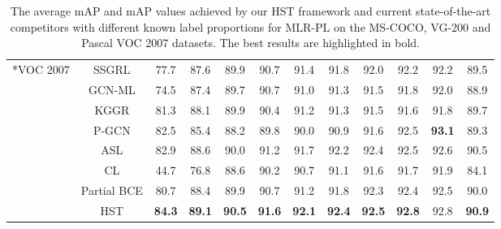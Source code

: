 \begin{table*}
\begin{tabular}{c|c|ccccccccc|c}
  \hline
  \centering \multirow{8}*{VOC 2007} & SSGRL & 77.7 & 87.6 & 89.9 & 90.7 & 91.4 & 91.8 & 92.0 & 92.2 & 92.2 & 89.5 \\
\centering ~ & GCN-ML & 74.5 & 87.4 & 89.7 & 90.7 & 91.0 & 91.3 & 91.5 & 91.8 & 92.0 & 88.9 \\
  \centering ~ & KGGR & 81.3 & 88.1 & 89.9 & 90.4 & 91.2 & 91.3 & 91.5 & 91.6 & 91.8 & 89.7 \\
  \centering ~ & P-GCN & 82.5 & 85.4 & 88.2 & 89.8 & 90.0 & 90.9 & 91.6 & 92.5 & \textbf{93.1} & 89.3 \\
  \centering ~ & ASL & 82.9 & 88.6 & 90.0 & 91.2 & 91.7 & 92.2 & 92.4 & 92.5 & 92.6 & 90.5 \\
  \centering ~ & CL & 44.7 & 76.8 & 88.6 & 90.2 & 90.7 & 91.1 & 91.6 & 91.7 & 91.9 & 84.1 \\
  \centering ~ & Partial BCE & 80.7 & 88.4 & 89.9 & 90.7 & 91.2 & 91.8 & 92.3 & 92.4 & 92.5 & 90.0 \\
\centering ~ & HST & \textbf{84.3} & \textbf{89.1} & \textbf{90.5} & \textbf{91.6} & \textbf{92.1} & \textbf{92.4} & \textbf{92.5} & \textbf{92.8} & 92.8 & \textbf{90.9} \\
  \hline
  \end{tabular}
  \vspace{10pt}
  \caption{The average mAP and mAP values achieved by our HST framework and current state-of-the-art competitors with different known label proportions for MLR-PL on the MS-COCO, VG-200 and Pascal VOC 2007 datasets. The best results are highlighted in bold.}
  \vspace{0pt}
  \label{tab:mAP-results}
\end{table*}

